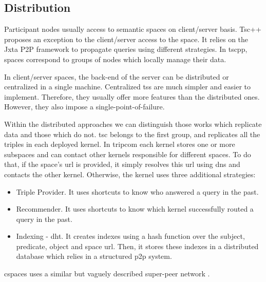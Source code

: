 



\subsection{Distribution} %
\label{sec:soa_tsc_distribution}

\begin{sloppypar}
Participant nodes usually access to semantic spaces on client/server basis.
Tsc++\citep{krummenacher_open_2009,blunder_distributed_2009} proposes an exception to the client/server access to the space.
It relies on the Jxta P2P framework  to propagate queries using different strategies.
In \acs{tscpp}, spaces correspond to groups of nodes which locally manage their data.
\end{sloppypar}


In client/server spaces, the back-end of the server can be distributed or centralized in a single machine.
Centralized \aclp{ts} are much simpler and easier to implement.
Therefore, they usually offer more features than the distributed ones.
However, they also impose a single-point-of-failure.


Within the distributed approaches we can distinguish those works which replicate data and those which do not.
\acs{tsc} belongs to the first group, and replicates all the triples in each deployed kernel.
In \ac{tripcom} each kernel stores one or more subspaces and can contact other kernels responsible for different spaces.
To do that, if the space's \ac{url} is provided, it simply resolves this \ac{url} using \ac{dns} and contacts the other kernel.
Otherwise, the kernel uses three additional strategies:
\begin{itemize}
  \item Triple Provider.
	It uses shortcuts to know who answered a query in the past.
  \item Recommender.
	It uses shortcuts to know which kernel successfully routed a query in the past.
  \item Indexing - \ac{dht}.
	It creates indexes using a hash function over the subject, predicate, object and space \ac{url}.
	Then, it stores these indexes in a distributed database which relies in a structured \ac{p2p} system. %
\end{itemize}
\ac{cspaces} uses a similar but vaguely described super-peer network \citep{martinrecuerda_application_2006}.


